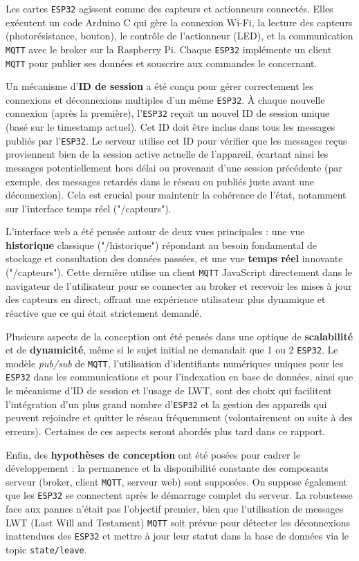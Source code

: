 \documentclass[12pt]{article}
\begin{document}
Les cartes \texttt{ESP32} agissent comme des capteurs et actionneurs connectés. Elles exécutent un code Arduino C qui gère la connexion Wi-Fi, la lecture des capteurs (photorésistance, bouton), le contrôle de l'actionneur (LED), et la communication \texttt{MQTT} avec le broker sur la Raspberry Pi. Chaque \texttt{ESP32} implémente un client \texttt{MQTT} pour publier ses données et souscrire aux commandes le concernant.

Un mécanisme d'\textbf{ID de session} a été conçu pour gérer correctement les connexions et déconnexions multiples d'un même \texttt{ESP32}. À chaque nouvelle connexion (après la première), l'\texttt{ESP32} reçoit un nouvel ID de session unique (basé sur le timestamp actuel). Cet ID doit être inclus dans tous les messages publiés par l'\texttt{ESP32}. Le serveur utilise cet ID pour vérifier que les messages reçus proviennent bien de la session active actuelle de l'appareil, écartant ainsi les messages potentiellement hors délai ou provenant d'une session précédente (par exemple, des messages retardés dans le réseau ou publiés juste avant une déconnexion). Cela est crucial pour maintenir la cohérence de l'état, notamment sur l'interface temps réel ("/capteurs").

L'interface web a été pensée autour de deux vues principales : une vue \textbf{historique} classique ("/historique") répondant au besoin fondamental de stockage et consultation des données passées, et une vue \textbf{temps réel} innovante ("/capteurs"). Cette dernière utilise un client \texttt{MQTT} JavaScript directement dans le navigateur de l'utilisateur pour se connecter au broker et recevoir les mises à jour des capteurs en direct, offrant une expérience utilisateur plus dynamique et réactive que ce qui était strictement demandé.

Plusieurs aspects de la conception ont été pensés dans une optique de \textbf{scalabilité} et de \textbf{dynamicité}, même si le sujet initial ne demandait que 1 ou 2 \texttt{ESP32}. Le modèle \textit{pub/sub} de \texttt{MQTT}, l'utilisation d'identifiants numériques uniques pour les \texttt{ESP32} dans les communications et pour l'indexation en base de données, ainsi que le mécanisme d'ID de session et l'usage de LWT, sont des choix qui facilitent l'intégration d'un plus grand nombre d'\texttt{ESP32} et la gestion des appareils qui peuvent rejoindre et quitter le réseau fréquemment (volontairement ou suite à des erreurs). Certaines de ces aspects seront abordés plus tard dans ce rapport.

Enfin, des \textbf{hypothèses de conception} ont été posées pour cadrer le développement : la permanence et la disponibilité constante des composants serveur (broker, client \texttt{MQTT}, serveur web) sont supposées. On suppose également que les \texttt{ESP32} se connectent après le démarrage complet du serveur. La robustesse face aux pannes n'était pas l'objectif premier, bien que l'utilisation de messages LWT (Last Will and Testament) \texttt{MQTT} soit prévue pour détecter les déconnexions inattendues des \texttt{ESP32} et mettre à jour leur statut dans la base de données via le topic \texttt{state/leave}.
\end{document}
